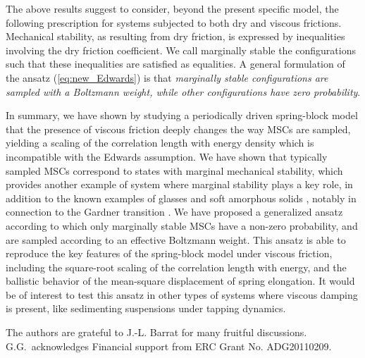 \documentclass[prl,twocolumn,floats,floatfix,aps,superscriptaddress,showpacs]{revtex4-1}
\begin{document}
The above results suggest to consider, beyond the present specific model, the following prescription for systems subjected to both dry and viscous frictions.
Mechanical stability, as resulting from dry friction, is expressed by inequalities involving the dry friction coefficient. We call marginally stable the configurations such that these inequalities are satisfied as equalities.
A general formulation of the ansatz (\ref{eq:new_Edwards}) is that \emph{marginally stable configurations are sampled with a Boltzmann weight, while other configurations have zero probability}.

In summary, we have shown by studying a periodically driven spring-block model that the presence of viscous friction deeply changes the way MSCs are sampled,
yielding a scaling of the correlation length with energy density which is
incompatible with the Edwards assumption.
We have shown that typically sampled MSCs correspond to states with marginal mechanical stability, which provides another example of system where marginal stability plays a key role, in addition to the known examples of glasses and soft amorphous solids \cite{Wyart15}, notably in connection to the Gardner transition \cite{Zamponi14}.
We have proposed a generalized ansatz according to which only marginally stable MSCs have a non-zero probability, and are sampled according to an effective Boltzmann weight.
This ansatz is able to reproduce the key features of the spring-block model under viscous friction, including the square-root scaling of the correlation length with energy, and the ballistic behavior of the mean-square displacement of spring elongation.
It would be of interest to test this ansatz in other types of systems where viscous damping is present, like sedimenting suspensions under tapping dynamics.


\begin{acknowledgments}
The authors are grateful to J.-L. Barrat for many fruitful discussions.
G.G.~acknowledges Financial support from ERC Grant No. ADG20110209.
\end{acknowledgments}
\end{document}
